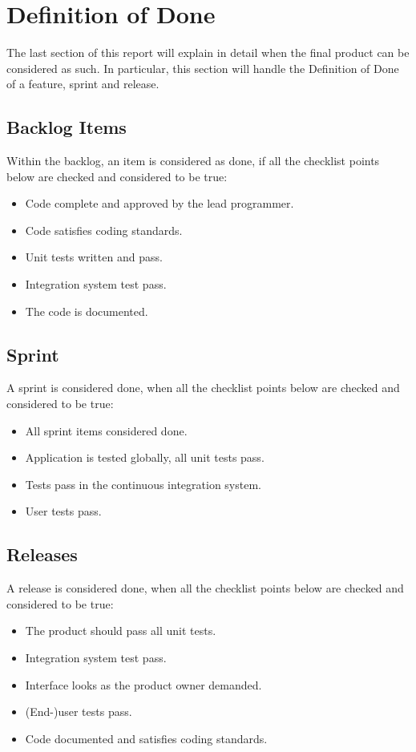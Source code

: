 \documentclass[11pt,twoside,a4paper]{article}
\begin{document}
\newpage

\section{Definition of Done}
The last section of this report will explain in detail when the final product can be considered as such. In particular, this section will handle the Definition of Done of a feature, sprint and release.


\subsection{Backlog Items}
Within the backlog, an item is considered as done, if all the checklist points below are checked and considered to be true:

\begin{itemize}
	\item Code complete and approved by the lead programmer.
	\item Code satisfies coding standards.
	\item Unit tests written and pass.
	\item Integration system test pass.
	\item The code is documented.
\end{itemize}


\subsection{Sprint}
A sprint is considered done, when all the checklist points below are checked and considered to be true:

\begin{itemize}
	\item All sprint items considered done.
	\item Application is tested globally, all unit tests pass.
	\item Tests pass in the continuous integration system.
	\item User tests pass.
\end{itemize}


\subsection{Releases}
A release is considered done, when all the checklist points below are checked and considered to be true:

\begin{itemize}
	\item The product should pass all unit tests.
	\item Integration system test pass.
	\item Interface looks as the product owner demanded.
	\item (End-)user tests pass.
	\item Code documented and satisfies coding standards.
\end{itemize}
\end{document}
